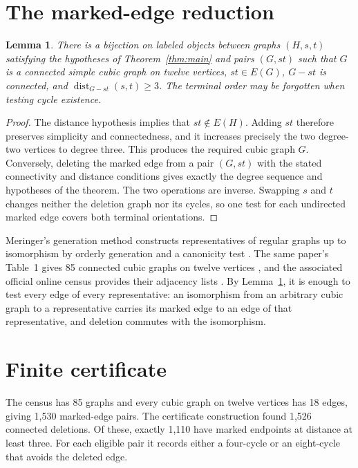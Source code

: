 \documentclass[11pt]{article}
\newtheorem{lemma}[theorem]{Lemma}
\begin{document}
\section{The marked-edge reduction}

\begin{lemma}\label{lem:bijection}
There is a bijection on labeled objects between graphs $(H,s,t)$ satisfying
the hypotheses of Theorem~\ref{thm:main} and pairs $(G,st)$ such that $G$ is a
connected simple cubic graph on twelve vertices, $st\in E(G)$, $G-st$ is
connected, and
\(\operatorname{dist}_{G-st}(s,t)\geq3\).
The terminal order may be forgotten when testing cycle existence.
\end{lemma}

\begin{proof}
The distance hypothesis implies that $st\notin E(H)$.  Adding $st$ therefore
preserves simplicity and connectedness, and it increases precisely the two
degree-two vertices to degree three.  This produces the required cubic graph
$G$.  Conversely, deleting the marked edge from a pair $(G,st)$ with the
stated connectivity and distance conditions gives exactly the degree sequence
and hypotheses of the theorem.  The two operations are inverse.  Swapping
$s$ and $t$ changes neither the deletion graph nor its cycles, so one test for
each undirected marked edge covers both terminal orientations.
\end{proof}

Meringer's generation method constructs representatives of regular graphs up
to isomorphism by orderly generation and a canonicity test
\cite{Meringer1999}.  The same paper's Table~1 gives 85 connected cubic graphs
on twelve vertices \cite[Table~1]{Meringer1999}, and the associated official
online census provides their adjacency lists \cite{MeringerCensus}.  By
Lemma~\ref{lem:bijection}, it is enough to
test every edge of every representative: an isomorphism from an arbitrary
cubic graph to a representative carries its marked edge to an edge of that
representative, and deletion commutes with the isomorphism.

\section{Finite certificate}

The census has 85 graphs and every cubic graph on twelve vertices has 18
edges, giving 1,530 marked-edge pairs.  The certificate construction found
1,526 connected deletions.  Of these, exactly 1,110 have marked endpoints at
distance at least three.  For each eligible pair it records either a
four-cycle or an eight-cycle that avoids the deleted edge.
\end{document}
